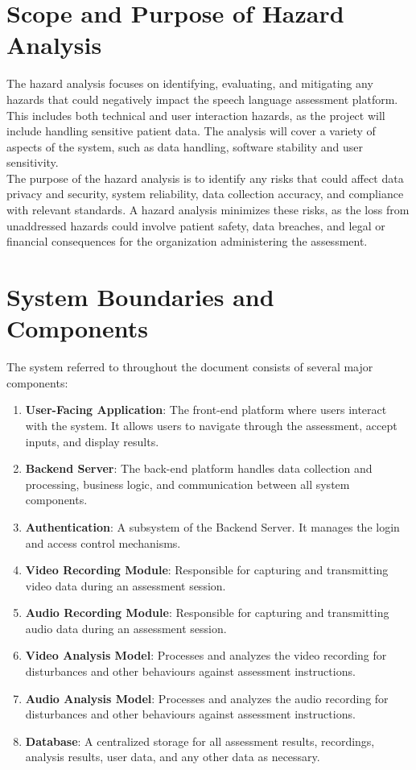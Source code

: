 \documentclass{article}
\begin{document}
\section{Scope and Purpose of Hazard Analysis}

\hspace{1.5em} The hazard analysis focuses on identifying, evaluating, and mitigating any hazards that could negatively 
impact the speech language assessment platform. This includes both technical and user interaction hazards,
as the project will include handling sensitive patient data. The analysis will cover a variety of aspects of the system, such as 
data handling, software stability and user sensitivity. \\
\indent The purpose of the hazard analysis is to identify any risks that could 
affect data privacy and security, system reliability, data collection accuracy, and compliance with relevant standards. A 
hazard analysis minimizes these risks, as the loss from unaddressed hazards could involve patient safety, data breaches, 
and legal or financial consequences for the organization administering the assessment.

\section{System Boundaries and Components}

The system referred to throughout the document consists of several major components: 
\begin{enumerate}
    \item \textbf{User-Facing Application}: The front-end platform where users interact with the system. It allows users to navigate through the assessment, accept inputs, and display results.
    \item \textbf{Backend Server}: The back-end platform handles data collection and processing, business logic, and communication between all system components.
    \item \textbf{Authentication}: A subsystem of the Backend Server. It manages the login and access control mechanisms.
    \item \textbf{Video Recording Module}: Responsible for capturing and transmitting video data during an assessment session.
    \item \textbf{Audio Recording Module}: Responsible for capturing and transmitting audio data during an assessment session.
    \item \textbf{Video Analysis Model}: Processes and analyzes the video recording for disturbances and other behaviours against assessment instructions.
    \item \textbf{Audio Analysis Model}: Processes and analyzes the audio recording for disturbances and other behaviours against assessment instructions.
    \item \textbf{Database}: A centralized storage for all assessment results, recordings, analysis results, user data, and any other data as necessary.
\end{enumerate}
\end{document}
